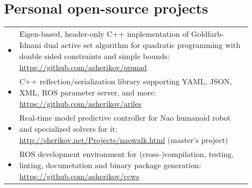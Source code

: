 \documentclass[a4paper,10pt]{report}
\begin{document}
\section{Personal open-source projects}
\begin{adjustwidth}{0.5cm}{0pt}
    \begin{tabularx}{\linewidth}{l X}
        \hfill $\bullet$    &   Eigen-based, header-only C++ implementation of Goldfarb-Idnani dual active set
                                algorithm for quadratic programming with double sided constraints and simple bounds:
                                \href{https://github.com/asherikov/qpmad}{https://github.com/asherikov/qpmad}\\

        \hfill $\bullet$    &   C++ reflection/serialization library supporting
                                YAML, JSON, XML, ROS parameter server, and more:
                                \href{https://github.com/asherikov/ariles}{https://github.com/asherikov/ariles}\\

        \hfill $\bullet$    &   Real-time model predictive controller for Nao
                                humanoid robot and specialized solvers for it:
                                \href{http://sherikov.net/Projects/naowalk.html}
                                {http://sherikov.net/Projects/naowalk.html} (master's project) \\

        \hfill $\bullet$    &   ROS development environment for (cross-)compilation, testing, linting,
                                documetation and binary package generation:
                                \href{https://github.com/asherikov/ccws}
                                {https://github.com/asherikov/ccws}
    \end{tabularx}
\end{adjustwidth}


\vspace{0.2cm}
\end{document}
